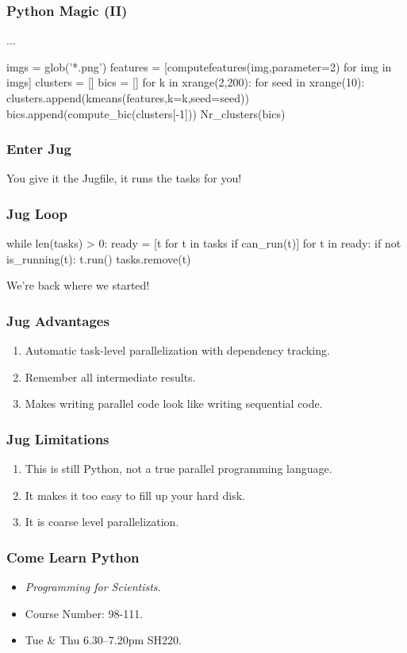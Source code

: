 \documentclass{beamer}
\begin{document}
\begin{frame}[fragile]
\frametitle{Python Magic (II)}

\begin{python}
...

imgs = glob('*.png')
features = [computefeatures(img,parameter=2)
            for img in imgs]
clusters = []
bics = []
for k in xrange(2,200):
    for seed in xrange(10):
        clusters.append(kmeans(features,k=k,seed=seed))
        bics.append(compute_bic(clusters[-1]))
Nr_clusters(bics)
\end{python}

\end{frame}

\begin{frame}[fragile]
\frametitle{Enter Jug}

You give it the Jugfile, it runs the tasks for you!

\end{frame}
\begin{frame}[fragile]
\frametitle{Jug Loop}

\begin{python}
while len(tasks) > 0:
    ready = [t for t in tasks if can_run(t)]
    for t in ready:
        if not is_running(t):
            t.run()
        tasks.remove(t)
\end{python}

We're back where we started!

\end{frame}

\begin{frame}[fragile]
\frametitle{Jug Advantages}
\begin{enumerate}
\item Automatic task-level parallelization with dependency tracking.
\item Remember all intermediate results.
\item Makes writing parallel code look like writing sequential code.
\end{enumerate}
\end{frame}

\begin{frame}[fragile]
\frametitle{Jug Limitations}
\begin{enumerate}
\item This is still \alert{Python}, not a true parallel programming language.
\item It makes it too easy to fill up your hard disk.
\item It is coarse level parallelization.
\end{enumerate}
\end{frame}

\begin{frame}[fragile]
\frametitle{Come Learn Python}

\begin{itemize}
\item \textit{Programming for Scientists}.
\item Course Number: 98-111.
\item Tue \& Thu 6.30--7.20pm SH220.
\end{itemize}
\end{frame}
\end{document}
